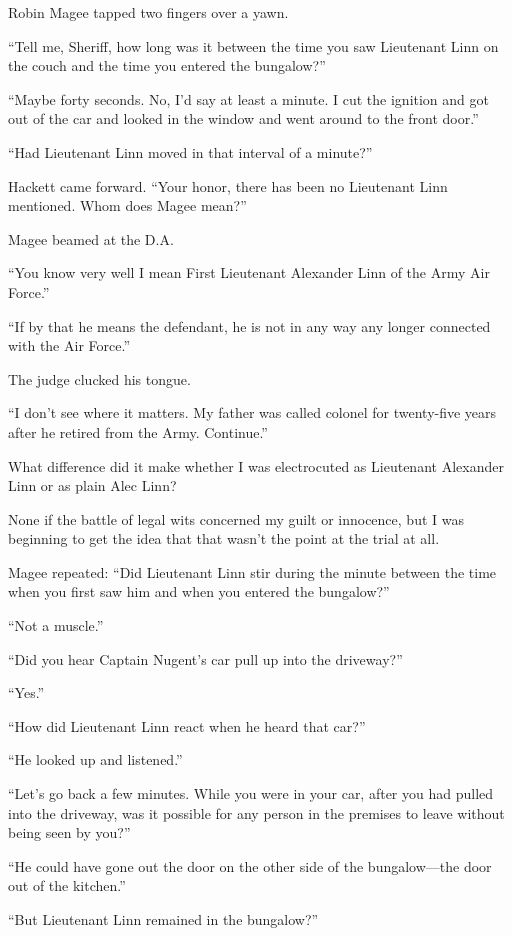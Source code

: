 \documentclass{novel}
\begin{document}
\scenestars

Robin Magee tapped two fingers over a yawn.

“Tell me, Sheriff, how long was it between the time you saw Lieutenant Linn on the couch and the time you entered the bungalow?”

“Maybe forty seconds. No, I’d say at least a minute. I cut the ignition and got out of the car and looked in the window and went around to the front door.”

“Had Lieutenant Linn moved in that interval of a minute?”

Hackett came forward. “Your honor, there has been no Lieutenant Linn mentioned. Whom does Magee mean?”

Magee beamed at the D.A. 

“You know very well I mean First Lieutenant Alexander Linn of the Army Air Force.”

“If by that he means the defendant, he is not in any way any longer connected with the Air Force.”

The judge clucked his tongue. 

“I don’t see where it matters. My father was called colonel for twenty-five years after he retired from the Army. Continue.”

What difference did it make whether I was electrocuted as Lieutenant Alexander Linn or as plain Alec Linn? 

None if the battle of legal wits concerned my guilt or innocence, but I was beginning to get the idea that that wasn’t the point at the trial at all.

Magee repeated: “Did Lieutenant Linn stir during the minute between the time when you first saw him and when you entered the bungalow?”

“Not a muscle.”

“Did you hear Captain Nugent’s car pull up into the driveway?”

“Yes.”

“How did Lieutenant Linn react when he heard that car?”

“He looked up and listened.”

“Let’s go back a few minutes. While you were in your car, after you had pulled into the driveway, was it possible for any person in the premises to leave without being seen by you?”

“He could have gone out the door on the other side of the bungalow—the door out of the kitchen.”

“But Lieutenant Linn remained in the bungalow?”
\end{document}
